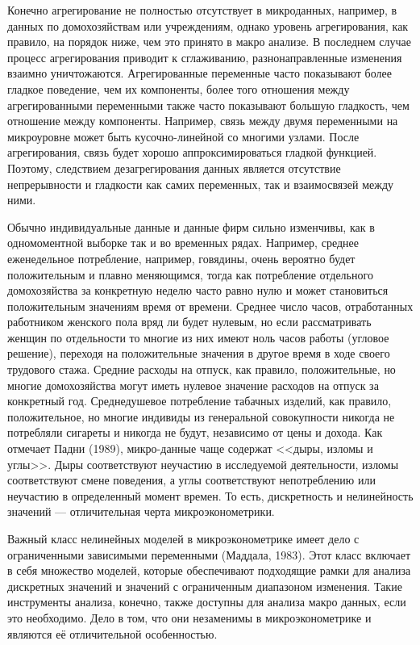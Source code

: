 	
Конечно агрегирование не полностью отсутствует в микроданных, например, в данных по домохозяйствам или учреждениям, однако уровень агрегирования, как правило, на порядок ниже, чем это принято в макро анализе. 
В последнем случае процесс агрегирования приводит к сглаживанию, разнонаправленные изменения взаимно уничтожаются. 
Агрегированные переменные часто показывают более гладкое поведение, чем их компоненты, более того отношения между агрегированными переменными также часто показывают большую гладкость, чем отношение между компоненты. Например, связь между двумя переменными на микроуровне может быть кусочно-линейной со многими узлами. После агрегирования, связь будет хорошо аппроксимироваться гладкой функцией. Поэтому, следствием дезагрегирования данных является отсутствие непрерывности и гладкости как самих переменных, так и взаимосвязей между ними.
	
	
Обычно индивидуальные данные и данные фирм сильно изменчивы, как в одномоментной выборке так и во временных рядах. Например, среднее еженедельное потребление, например,  говядины, очень вероятно будет положительным и плавно меняющимся, тогда как потребление отдельного домохозяйства за конкретную неделю часто равно нулю и может становиться положительным значениям время от времени. 
Среднее число часов, отработанных работником женского пола вряд ли будет нулевым, но если рассматривать женщин по отдельности то многие из них имеют ноль часов работы (угловое решение), переходя на положительные значения в другое время в ходе своего трудового стажа. Средние расходы на отпуск, как правило, положительные, но многие домохозяйства могут иметь нулевое значение расходов на отпуск за конкретный год. Среднедушевое потребление табачных изделий, как правило, положительное, но многие индивиды из генеральной совокупности никогда не потребляли сигареты и никогда не будут, независимо от цены и дохода. Как отмечает Падни (1989), микро-данные чаще содержат  <<дыры, изломы и углы>>. Дыры соответствуют неучастию в исследуемой деятельности, изломы соответствуют смене поведения, а углы соответствуют непотреблению или неучастию в определенный момент времен. То есть, дискретность и нелинейность значений --- отличительная черта микроэконометрики.
	
	
Важный класс нелинейных моделей в микроэконометрике имеет дело с ограниченными зависимыми переменными (Маддала, 1983). Этот класс включает в себя множество моделей, которые обеспечивают подходящие рамки для анализа дискретных значений и значений с ограниченным диапазоном изменения. Такие инструменты анализа, конечно, также доступны для анализа макро данных, если это необходимо. Дело в том, что они незаменимы в микроэконометрике и являются её отличительной особенностью.

